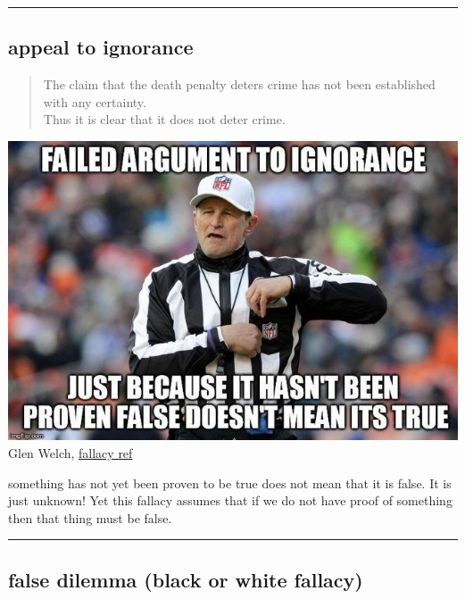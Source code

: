 \documentclass[justified]{tufte-book}
\newenvironment{argument}{\begin{quote}\normalsize}{\end{quote}}
\begin{document}
\begin{center}\rule{0.5\linewidth}{\linethickness}\end{center}

\hypertarget{appeal-to-ignorance}{%
\subsection*{appeal to ignorance}\label{appeal-to-ignorance}}

\begin{argument}
The claim that the death penalty deters crime has not been established
with any certainty.\\
Thus it is clear that it does not deter crime.
\end{argument}

\begin{marginfigure}
\includegraphics{img/fallacies/ignorance.jpg}\\
Glen Welch, \href{https://twitter.com/fallacy_ref?lang=en}{fallacy ref}
\end{marginfigure}

 something has not yet been proven to be true does not mean that it is false. It is just unknown! Yet this fallacy assumes that if we do not have proof of something then that thing must be false.

\begin{center}\rule{0.5\linewidth}{\linethickness}\end{center}

\hypertarget{false-dilemma-black-or-white-fallacy}{%
\subsection*{false dilemma (black or white fallacy)}\label{false-dilemma-black-or-white-fallacy}}
\end{document}
